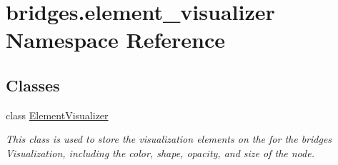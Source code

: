 \hypertarget{namespacebridges_1_1element__visualizer}{}\section{bridges.\+element\+\_\+visualizer Namespace Reference}
\label{namespacebridges_1_1element__visualizer}
\subsection*{Classes}
\begin{DoxyCompactItemize}
\item 
class \mbox{\hyperlink{classbridges_1_1element__visualizer_1_1_element_visualizer}{Element\+Visualizer}}
\begin{DoxyCompactList}\small\item\em This class is used to store the visualization elements on the for the bridges Visualization, including the color, shape, opacity, and size of the node. \end{DoxyCompactList}\end{DoxyCompactItemize}
